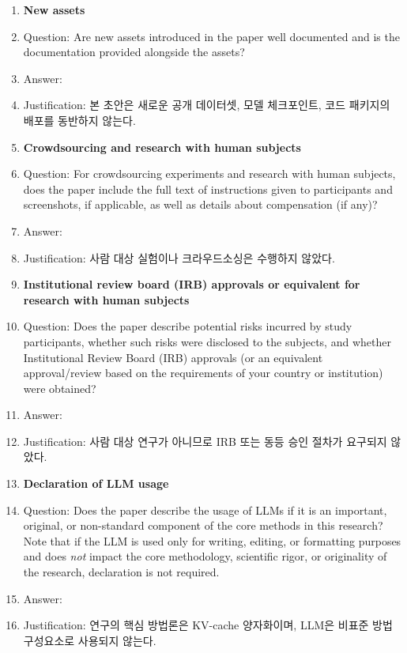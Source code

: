 \begin{enumerate}
\item {\bf New assets}
    \item[] Question: Are new assets introduced in the paper well documented and is the documentation provided alongside the assets?
    \item[] Answer: \answerNA{}
    \item[] Justification: 본 초안은 새로운 공개 데이터셋, 모델 체크포인트, 코드 패키지의 배포를 동반하지 않는다.

\item {\bf Crowdsourcing and research with human subjects}
    \item[] Question: For crowdsourcing experiments and research with human subjects, does the paper include the full text of instructions given to participants and screenshots, if applicable, as well as details about compensation (if any)? 
    \item[] Answer: \answerNA{}
    \item[] Justification: 사람 대상 실험이나 크라우드소싱은 수행하지 않았다.

\item {\bf Institutional review board (IRB) approvals or equivalent for research with human subjects}
    \item[] Question: Does the paper describe potential risks incurred by study participants, whether such risks were disclosed to the subjects, and whether Institutional Review Board (IRB) approvals (or an equivalent approval/review based on the requirements of your country or institution) were obtained?
    \item[] Answer: \answerNA{}
    \item[] Justification: 사람 대상 연구가 아니므로 IRB 또는 동등 승인 절차가 요구되지 않았다.

\item {\bf Declaration of LLM usage}
    \item[] Question: Does the paper describe the usage of LLMs if it is an important, original, or non-standard component of the core methods in this research? Note that if the LLM is used only for writing, editing, or formatting purposes and does \emph{not} impact the core methodology, scientific rigor, or originality of the research, declaration is not required.
    \item[] Answer: \answerNA{}
    \item[] Justification: 연구의 핵심 방법론은 KV-cache 양자화이며, LLM은 비표준 방법 구성요소로 사용되지 않는다.

\end{enumerate}

